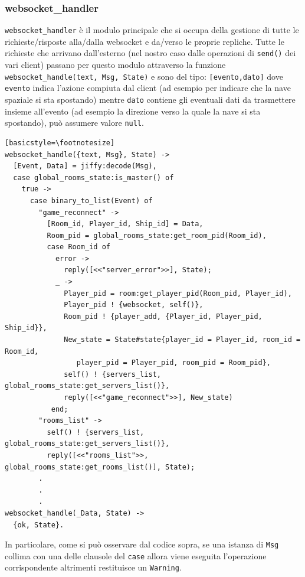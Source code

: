 \documentclass[paper=a4, fontsize=11pt]{scrartcl} %
\numberwithin{equation}{section} %
\numberwithin{figure}{section} %
\numberwithin{table}{section} %
\begin{document}
\subsubsection{websocket\_handler}
\texttt{websocket\_handler} è il modulo principale che si occupa della gestione di tutte le richieste/risposte alla/dalla websocket e da/verso le proprie repliche. Tutte le richieste che arrivano dall'esterno (nel nostro caso dalle operazioni di \texttt{send()} dei vari client) passano per questo modulo attraverso la funzione \texttt{websocket\_handle({text, Msg}, State)} e sono del tipo: \texttt{[evento,dato]} dove \texttt{evento} indica l'azione compiuta dal client (ad esempio per indicare che la nave spaziale si sta spostando) mentre \texttt{dato} contiene gli eventuali dati da trasmettere insieme all'evento (ad esempio la direzione verso la quale la nave si sta spostando), può assumere valore \texttt{null}.
\begin{lstlisting}[basicstyle=\footnotesize][basicstyle=\footnotesize]
websocket_handle({text, Msg}, State) ->
  [Event, Data] = jiffy:decode(Msg),
  case global_rooms_state:is_master() of
    true ->
      case binary_to_list(Event) of
        "game_reconnect" ->
          [Room_id, Player_id, Ship_id] = Data,
          Room_pid = global_rooms_state:get_room_pid(Room_id),
          case Room_id of
            error ->
              reply([<<"server_error">>], State);
            _ ->
              Player_pid = room:get_player_pid(Room_pid, Player_id),
              Player_pid ! {websocket, self()},
              Room_pid ! {player_add, {Player_id, Player_pid, Ship_id}},
              New_state = State#state{player_id = Player_id, room_id = Room_id,
              	 player_pid = Player_pid, room_pid = Room_pid},
              self() ! {servers_list, global_rooms_state:get_servers_list()},
              reply([<<"game_reconnect">>], New_state)
           end;
        "rooms_list" ->
          self() ! {servers_list, global_rooms_state:get_servers_list()},
          reply([<<"rooms_list">>, global_rooms_state:get_rooms_list()], State);
        .
        .
        .
websocket_handle(_Data, State) ->
  {ok, State}.
\end{lstlisting}
In particolare, come si può osservare dal codice sopra, se una istanza di \texttt{Msg} collima con una delle clausole del \texttt{case} allora viene eseguita l'operazione corrispondente altrimenti restituisce un \texttt{Warning}.

\end{document}

